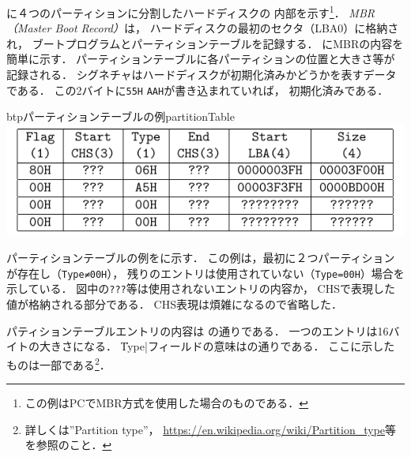 \begin{enumerate}
  に４つのパーティションに分割したハードディスクの
  内部を示す\footnote{この例はPCでMBR方式を使用した場合のものである．}．
  \emph{MBR（Master Boot Record）}は，
  ハードディスクの最初のセクタ（LBA0）に格納され，
  ブートプログラムとパーティションテーブルを記録する．
  にMBRの内容を簡単に示す．
  パーティションテーブルに各パーティションの位置と大きさ等が記録される．
  シグネチャはハードディスクが初期化済みかどうかを表すデータである．
  この2バイトに\texttt{55H} \texttt{AAH}が書き込まれていれば，
  初期化済みである．
  
  \begin{myfig}{btp}{パーティションテーブルの例}{partitionTable}
    \includegraphics[scale=1.0]{Fig/partitionTable.pdf}
  \end{myfig}

  パーティションテーブルの例をに示す．
  この例は，最初に２つパーティションが存在し（\texttt{Type≠00H}），
  残りのエントリは使用されていない（\texttt{Type=00H}）場合を示している．
  図中の\texttt{???}等は使用されないエントリの内容か，
  CHSで表現した値が格納される部分である．
  CHS表現は煩雑になるので省略した．

  パティションテーブルエントリの内容は
  の通りである．
  一つのエントリは16バイトの大きさになる．
  \|Type|フィールドの意味はの通りである．
  ここに示したものは一部である\footnote{
    詳しくは''Partition type''，
    \url{https://en.wikipedia.org/wiki/Partition_type}等を参照のこと．}．


\end{enumerate}
